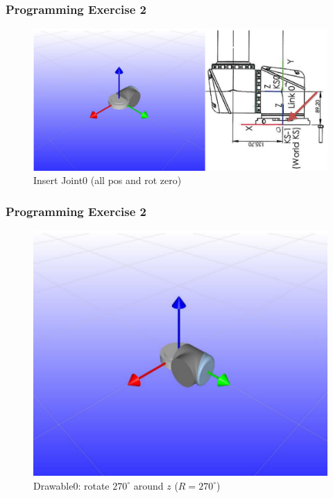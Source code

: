 \documentclass{beamer}
\begin{document}

\begin{frame}
  \frametitle{Programming Exercise 2}
  \begin{centering}
    \begin{figure}
    \includegraphics[height=0.6\textheight]{./graphics/ex33_4}
    \caption{Insert Joint0 (all pos and rot zero)}
    \end{figure}
    \end{centering}
  \end{frame}
  

\begin{frame}
  \frametitle{Programming Exercise 2}
  \begin{centering}
    \begin{figure}
    \includegraphics[height=0.6\textheight]{./graphics/ex33_5}
    \caption{Drawable0: rotate $270^{\circ}$ around $z$ ($R=270^{\circ}$)}
    \end{figure}
    \end{centering}
  \end{frame}
  
\end{document}
